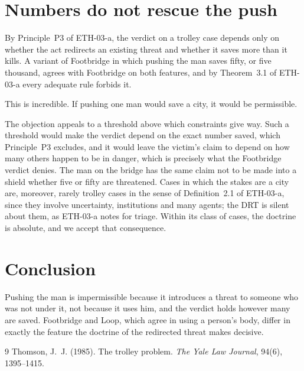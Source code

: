 \documentclass{situationist-preprint}
\begin{document}
\section{Numbers do not rescue the push}

By Principle~P3 of ETH-03-a, the verdict on a trolley case depends only on whether the act redirects an existing threat and whether it saves more than it kills. A variant of Footbridge in which pushing the man saves fifty, or five thousand, agrees with Footbridge on both features, and by Theorem~3.1 of ETH-03-a every adequate rule forbids it.

\begin{objection}
This is incredible. If pushing one man would save a city, it would be permissible.
\end{objection}

\begin{reply}
The objection appeals to a threshold above which constraints give way. Such a threshold would make the verdict depend on the exact number saved, which Principle~P3 excludes, and it would leave the victim's claim to depend on how many others happen to be in danger, which is precisely what the Footbridge verdict denies. The man on the bridge has the same claim not to be made into a shield whether five or fifty are threatened. Cases in which the stakes are a city are, moreover, rarely trolley cases in the sense of Definition~2.1 of ETH-03-a, since they involve uncertainty, institutions and many agents; the DRT is silent about them, as ETH-03-a notes for triage. Within its class of cases, the doctrine is absolute, and we accept that consequence.
\end{reply}

\section{Conclusion}

Pushing the man is impermissible because it introduces a threat to someone who was not under it, not because it uses him, and the verdict holds however many are saved. Footbridge and Loop, which agree in using a person's body, differ in exactly the feature the doctrine of the redirected threat makes decisive.

\begin{thebibliography}{9}\small
{} Thomson, J.~J. (1985). The trolley problem. \emph{The Yale Law Journal}, 94(6), 1395--1415.
\end{thebibliography}
\end{document}
